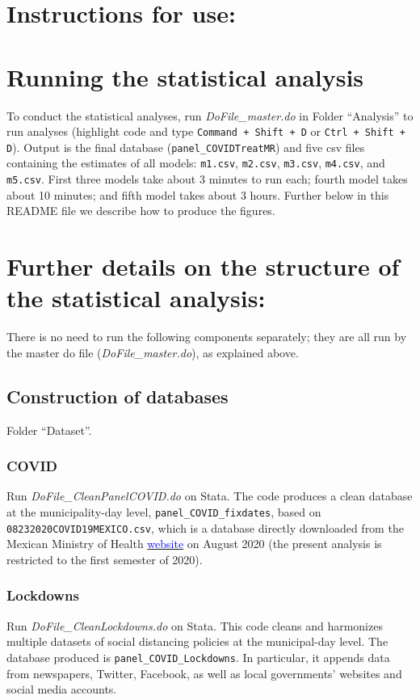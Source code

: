 \documentclass{article}
\begin{document}
\section{Instructions for use:}

\section*{Running the statistical analysis}

\large{To conduct the statistical analyses, run \textit{DoFile\_master.do} in Folder ``Analysis'' to run analyses (highlight code and type \texttt{Command + Shift + D} or \texttt{Ctrl + Shift + D}). Output is the final database (\texttt{panel\_COVIDTreatMR}) and five csv files containing the estimates of all models:  \texttt{m1.csv}, \texttt{m2.csv}, \texttt{m3.csv}, \texttt{m4.csv}, and \texttt{m5.csv}. First three models take about 3 minutes to run each; fourth model takes about 10 minutes; and fifth model takes about 3 hours. Further below in this README file we describe how to produce the figures.}

\section*{Further details on the structure of the statistical analysis:}
There is no need to run the following components separately; they are all run by the master do file (\textit{DoFile\_master.do}), as explained above.

\subsection*{Construction of databases}
Folder ``Dataset''.
\subsubsection*{COVID}
Run \textit{DoFile\_CleanPanelCOVID.do} on Stata. The code produces a clean database at the municipality-day level, \texttt{panel\_COVID\_fixdates}, based on \texttt{08232020COVID19MEXICO.csv}, which is a database directly downloaded from the Mexican Ministry of Health \href{https://www.gob.mx/salud/documentos/datos-abiertos-bases-historicas-direccion-general-de-epidemiologia}{\textcolor{blue}{website}} on August 2020 (the present analysis is restricted to the first semester of 2020).

\subsubsection*{Lockdowns}
Run \textit{DoFile\_CleanLockdowns.do} on Stata. This code cleans and harmonizes multiple datasets of social distancing policies at the municipal-day level. The database produced is \texttt{panel\_COVID\_Lockdowns}. In particular, it appends data from newspapers, Twitter, Facebook, as well as local governments' websites and social media accounts. 
\end{document}
